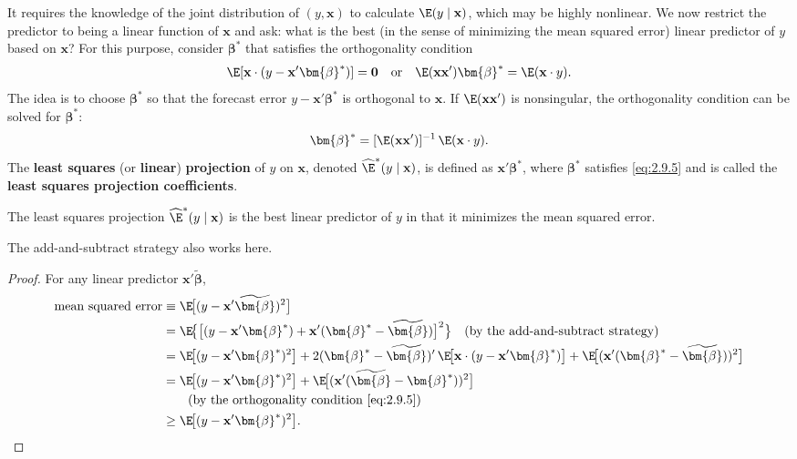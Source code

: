 It requires the knowledge of the joint distribution of $(y, \mathbf{x})$ to calculate
$\E(y \mid \mathbf{x})$, which may be highly nonlinear. We now restrict the predictor to being
a linear function of $\mathbf{x}$ and ask: what is the best (in the sense of minimizing the mean
squared error) linear predictor of $y$ based on $\mathbf{x}$? For this purpose, consider
$\bm{\beta}^*$ that satisfies the orthogonality condition
%
\begin{equation}
\E[\mathbf{x} \cdot (y - \mathbf{x}'\bm{\beta}^*)] = \mathbf{0}
\quad \text{or} \quad
\E(\mathbf{x}\mathbf{x}')\bm{\beta}^* = \E(\mathbf{x} \cdot y).
\label{eq:2.9.5}
\end{equation}
%
The idea is to choose $\bm{\beta}^*$ so that the forecast error $y - \mathbf{x}'\bm{\beta}^*$ is orthogonal to
$\mathbf{x}$. If $\E(\mathbf{x}\mathbf{x}')$ is nonsingular, the orthogonality condition can be solved for
$\bm{\beta}^*$:
%
\begin{equation}
\bm{\beta}^* = [\E(\mathbf{x}\mathbf{x}')]^{-1}\,\E(\mathbf{x} \cdot y).
\label{eq:2.9.6}
\end{equation}
%
The \textbf{least squares} (or \textbf{linear}) \textbf{projection} of $y$ on $\mathbf{x}$, denoted
$\widehat{\E}^*(y \mid \mathbf{x})$, is defined as $\mathbf{x}'\bm{\beta}^*$, where $\bm{\beta}^*$ satisfies
\eqref{eq:2.9.5} and is called the \textbf{least squares projection coefficients}.

\begin{proposition}[2.8]
\label{prop:2.8}
The least squares projection $\widehat{\E}^*(y \mid \mathbf{x})$ is the best linear predictor
of $y$ in that it minimizes the mean squared error.
\end{proposition}

The add-and-subtract strategy also works here.

\begin{proof}
For any linear predictor $\mathbf{x}'\widetilde{\bm{\beta}}$,
%
\begin{align*}
\text{mean squared error} &\equiv \E\!\big[(y - \mathbf{x}'\widetilde{\bm{\beta}})^2\big] \\
&= \E\!\big\{\big[(y - \mathbf{x}'\bm{\beta}^*)
  + \mathbf{x}'(\bm{\beta}^* - \widetilde{\bm{\beta}})\big]^2\big\}
  \quad \text{(by the add-and-subtract strategy)} \\
&= \E\!\big[(y - \mathbf{x}'\bm{\beta}^*)^2\big]
  + 2(\bm{\beta}^* - \widetilde{\bm{\beta}})'\,
  \E\!\big[\mathbf{x} \cdot (y - \mathbf{x}'\bm{\beta}^*)\big]
  + \E\!\big[(\mathbf{x}'(\bm{\beta}^* - \widetilde{\bm{\beta}}))^2\big] \\
&= \E\!\big[(y - \mathbf{x}'\bm{\beta}^*)^2\big]
  + \E\!\big[(\mathbf{x}'(\widetilde{\bm{\beta}} - \bm{\beta}^*))^2\big] \\
&\qquad \text{(by the orthogonality condition \eqref{eq:2.9.5})} \\
&\geq \E\!\big[(y - \mathbf{x}'\bm{\beta}^*)^2\big]. \qedhere
\end{align*}
\end{proof}

